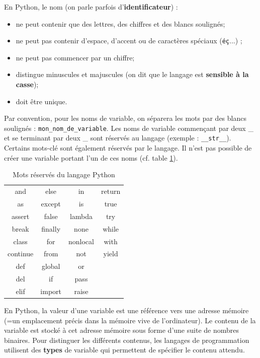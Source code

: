 \documentclass[12pt, a4paper]{article}
\begin{document}
En Python, le nom (on parle parfois d'\textbf{identificateur}) :
\begin{itemize}
	\item ne peut contenir que des lettres, des chiffres et des blancs soulignés;
	\item ne peut pas contenir d'espace, d'accent ou de caractères spéciaux (\lstinline{éç}...) ;
	\item ne peut pas commencer par un chiffre;
	\item distingue minuscules et majuscules (on dit que le langage est \textbf{sensible à la casse});
	\item doit être unique.
\end{itemize}

Par convention, pour les noms de variable, on séparera les mots par des blancs soulignés : \lstinline{mon_nom_de_variable}. Les noms de variable commençant par deux \_ et se terminant par deux \_ sont réservés au langage (exemple : \lstinline{__str__}). Certains mots-clé sont également réservés par le langage. Il n'est pas possible de créer une variable portant l'un de ces noms (cf. table \ref{tab:mots_reserves}).
\begin{table}[H]
	\begin{center}
		\begin{tabular}{c c c c}
			and 		& else 			& in				& return \\
			as 			& except 		& is 				& true \\
			assert 	& false  		& lambda 		& try \\
			break 	& finally 	& none 			& while \\
			class 	& for 			& nonlocal 	& with \\
			continue& from 			& not 			& yield \\
			def 		& global 		& or 				&  \\
			del 		& if 				& pass 			&  \\
			elif 		& import 		& raise 		&  \\
		\end{tabular}
	\end{center}
	\caption{Mots réservés du langage Python}
	\label{tab:mots_reserves}
\end{table}

En Python, la valeur d'une variable est une référence vers une adresse mémoire (=un emplacement précis dans la mémoire vive de l'ordinateur). Le contenu de la variable est stocké à cet adresse mémoire sous forme d'une suite de nombres binaires. Pour distinguer les différents contenus, les langages de programmation utilisent des \textbf{types} de variable qui permettent de spécifier le contenu attendu.
\end{document}
